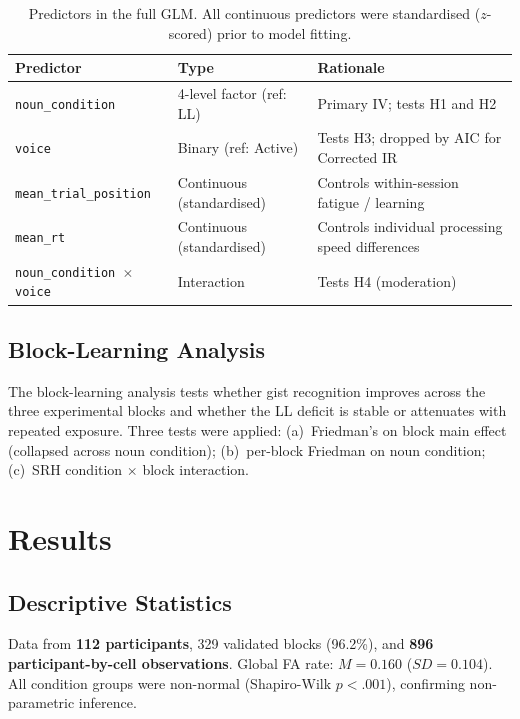 \documentclass[12pt, a4paper]{article}
\begin{document}
\begin{table}[htbp]
  \centering\small
  \begin{tabular}{lll}
    \toprule
    \textbf{Predictor} & \textbf{Type} & \textbf{Rationale} \\
    \midrule
    \texttt{noun\_condition} & 4-level factor (ref: LL)
      & Primary IV; tests H1 and H2 \\
    \texttt{voice} & Binary (ref: Active)
      & Tests H3; dropped by AIC for Corrected IR \\
    \texttt{mean\_trial\_position} & Continuous (standardised)
      & Controls within-session fatigue / learning \\
    \texttt{mean\_rt} & Continuous (standardised)
      & Controls individual processing speed differences \\
    \texttt{noun\_condition $\times$ voice} & Interaction
      & Tests H4 (moderation) \\
    \bottomrule
  \end{tabular}
  \caption{Predictors in the full GLM. All continuous predictors were
  standardised ($z$-scored) prior to model fitting.}
  \label{tab:glm_predictors}
\end{table}

\subsection{Block-Learning Analysis}

The block-learning analysis tests whether gist recognition improves
across the three experimental blocks and whether the LL deficit is stable
or attenuates with repeated exposure. Three tests were applied:
(a)~Friedman's on block main effect (collapsed across noun condition);
(b)~per-block Friedman on noun condition;
(c)~SRH condition $\times$ block interaction.

\section{Results}

\subsection{Descriptive Statistics}

Data from \textbf{112 participants}, 329 validated blocks (96.2\%), and
\textbf{896 participant-by-cell observations}. Global FA rate:
$M = 0.160$ ($SD = 0.104$). All condition groups were non-normal
(Shapiro-Wilk $p < .001$), confirming non-parametric inference.
\end{document}
